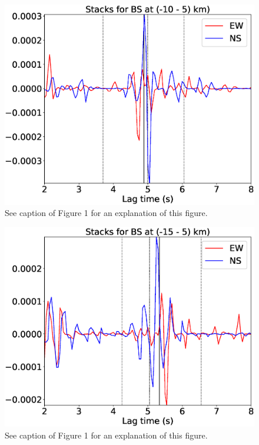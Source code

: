 \documentclass[letterpaper, 12pt]{article}
\begin{document}
\begin{figure}[H]
\includegraphics[width=\linewidth]{figures/intervals/BS_-10_005_stacks.eps}
\caption{See caption of Figure 1 for an explanation of this figure.}
\end{figure}

\begin{figure}[H]
\includegraphics[width=\linewidth]{figures/intervals/BS_-15_005_stacks.eps}
\caption{See caption of Figure 1 for an explanation of this figure.}
\end{figure}
\end{document}
